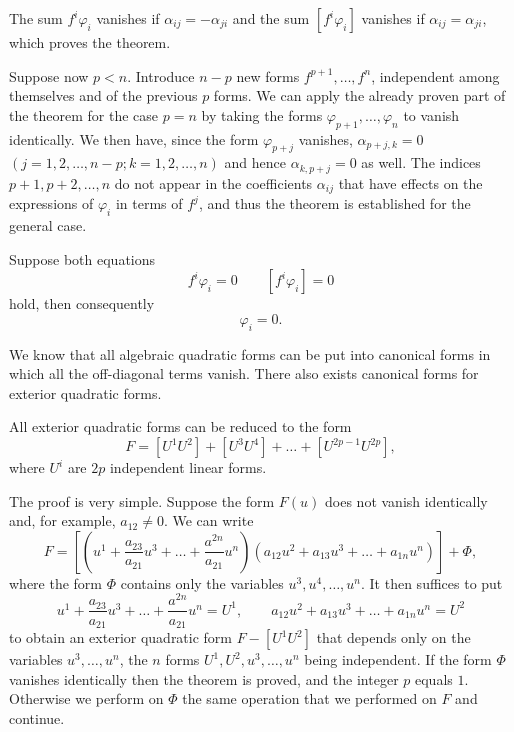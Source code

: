 The sum $f^{i}\varphi_{i}$ vanishes if $\alpha_{ij}=-\alpha_{ji}$ and the sum $[f^{i}\varphi_{i}]$ vanishes if $\alpha_{ij}=\alpha_{ji}$, which proves the theorem.

Suppose now $p<n$. Introduce $n-p$ new forms $f^{p+1},\dots,f^{n}$, independent among themselves and of the previous $p$ forms. We can apply the already proven part of the theorem for the case $p=n$ by taking the forms $\varphi_{p+1},\dots,\varphi_{n}$ to vanish identically. We then have, since the form $\varphi_{p+j}$ vanishes, $\alpha_{p+j,k}=0$ $(j=1,2,\dots,n-p;k=1,2,\dots,n)$ and hence $\alpha_{k,p+j}=0$ as well. The indices $p+1,p+2,\dots,n$ do not appear in the coefficients $\alpha_{ij}$ that have effects on the expressions of $\varphi_{i}$ in terms of $f^{j}$, and thus the theorem is established for the general case.

\begin{rmk*}
  Suppose both equations
\[
f^{i}\varphi_{i}=0\qquad[f^{i}\varphi_{i}]=0
\]
hold, then consequently
\[
\varphi_{i}=0.
\]
\end{rmk*}

\vspace{12pt}\fsec We know that all algebraic quadratic forms can be put into canonical forms in which all the off-diagonal terms vanish. There also exists canonical forms for exterior quadratic forms.

\begin{thm*}
  All exterior quadratic forms can be reduced to the form
  \begin{equation}
    \label{eq:6}
    F=[U^{1}U^{2}]+[U^{3}U^{4}]+\dots+[U^{2p-1}U^{2p}],
  \end{equation}
where $U^{i}$ are $2p$ independent linear forms.
\end{thm*}

The proof is very simple. Suppose the form $F(u)$ does not vanish identically and, for example, $a_{12}\neq 0$. We can write
\[
F=\left[\left(u^{1}+\frac{a_{23}}{a_{21}}u^{3}+\dots+\frac{a^{2n}}{a_{21}}u^{n}\right)(a_{12}u^{2}+a_{13}u^{3}+\dots+a_{1n}u^{n})\right]+\Phi,
\]
where the form $\Phi$ contains only the variables $u^{3},u^{4}, \dots, u^{n}$. It  then suffices to put
\[
u^{1}+\frac{a_{23}}{a_{21}}u^{3}+\dots+\frac{a^{2n}}{a_{21}}u^{n}=U^{1},\qquad a_{12}u^{2}+a_{13}u^{3}+\dots+a_{1n}u^{n}=U^{2}
\]
to obtain an exterior quadratic form $F-[U^{1}U^{2}]$ that depends only on the variables $u^{3},\dots,u^{n}$, the $n$ forms $U^{1},U^{2},u^{3},\dots,u^{n}$ being independent. If the form $\Phi$ vanishes identically then the theorem is proved, and the integer $p$ equals $1$. Otherwise we perform on $\Phi$ the same operation that we performed on $F$ and continue.


